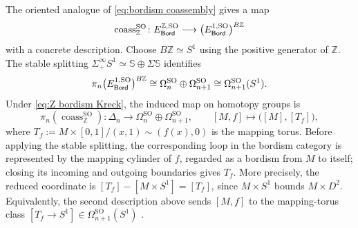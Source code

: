 \documentclass[a4paper,11pt]{article}
\begin{document}
The oriented analogue of \cref{eq:bordism coassembly} gives a map
\[
  \operatorname{coass}^{\mathrm{SO}}_{\mathbb Z}\colon
  E_{\textup{\textsf{Bord}}}^{\mathbb Z,\mathrm{SO}}\longrightarrow
    \bigl(E_{\textup{\textsf{Bord}}}^{1,\mathrm{SO}}\bigr)^{B\mathbb Z}
\]
with a concrete description. Choose $B\mathbb Z\simeq S^1$ using the
positive generator of $\mathbb Z$.
The stable splitting
$\Sigma^\infty_+S^1\simeq\mathbb S\oplus \Sigma\mathbb S$ identifies
\[
  \pi_n\bigl(E_{\textup{\textsf{Bord}}}^{1,\mathrm{SO}}\bigr)^{B\mathbb Z}
    \cong\Omega_n^{\mathrm{SO}}\oplus
      \Omega_{n+1}^{\mathrm{SO}}
    \cong\Omega_{n+1}^{\mathrm{SO}}(S^1).
\]
Under \cref{eq:Z bordism Kreck}, the induced map on homotopy groups is
\begin{equation}\label{eq:Z coassembly mapping torus}
  \pi_n(\operatorname{coass}^{\mathrm{SO}}_{\mathbb Z})\colon
  \Delta_n\longrightarrow
  \Omega_n^{\mathrm{SO}}\oplus\Omega_{n+1}^{\mathrm{SO}},
  \qquad
  [M,f]\longmapsto\bigl([M],[T_f]\bigr),
\end{equation}
where
$
  T_f:=M\times[0,1]/(x,1)\sim(f(x),0)
$
is the mapping torus.  Before applying the stable splitting, the
corresponding loop in the bordism category is represented by the
mapping cylinder of $f$, regarded as a bordism from $M$ to itself;
closing its incoming and outgoing boundaries gives $T_f$.  More
precisely, the reduced coordinate is
$[T_f]-[M\times S^1]=[T_f]$, since $M\times S^1$ bounds
$M\times D^2$.  Equivalently,
the second description above sends $[M,f]$ to the mapping-torus class
$[T_f\to S^1]\in\Omega_{n+1}^{\mathrm{SO}}(S^1)$
\cite[Definition~28.8, Remark~28.9, and
Proposition~28.10(ii)]{RanickiKnot}. \\
\end{document}
